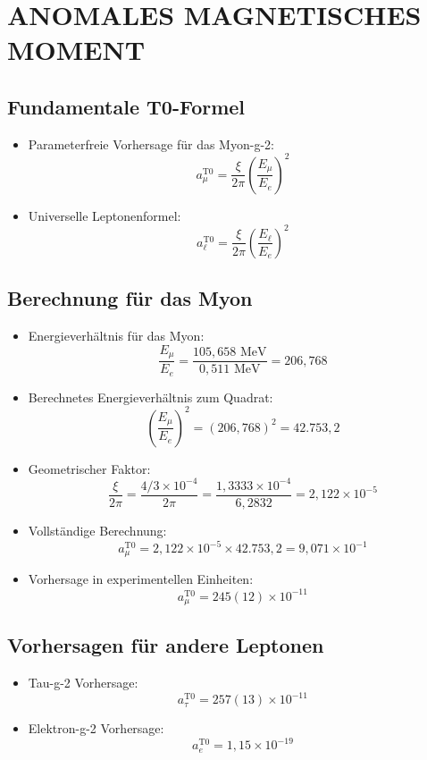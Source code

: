 \documentclass[12pt,a4paper]{article}
\begin{document}
	\section{ANOMALES MAGNETISCHES MOMENT}
	
	\subsection{Fundamentale T0-Formel}
	\begin{itemize}
		\item Parameterfreie Vorhersage f\"{u}r das Myon-g-2:
		$$\boxed{a_\mu^{\text{T0}} = \frac{\xi}{2\pi} \left(\frac{E_\mu}{E_e}\right)^2}$$
		
		\item Universelle Leptonenformel:
		$$\boxed{a_\ell^{\text{T0}} = \frac{\xi}{2\pi} \left(\frac{E_\ell}{E_e}\right)^2}$$
	\end{itemize}
	
	\subsection{Berechnung f\"{u}r das Myon}
	\begin{itemize}
		\item Energieverh\"{a}ltnis f\"{u}r das Myon:
		$$\frac{E_\mu}{E_e} = \frac{105,658 \text{ MeV}}{0,511 \text{ MeV}} = 206,768$$
		
		\item Berechnetes Energieverh\"{a}ltnis zum Quadrat:
		$$\left(\frac{E_\mu}{E_e}\right)^2 = (206,768)^2 = 42.753,2$$
		
		\item Geometrischer Faktor:
		$$\frac{\xi}{2\pi} = \frac{4/3 \times 10^{-4}}{2\pi} = \frac{1,3333 \times 10^{-4}}{6,2832} = 2,122 \times 10^{-5}$$
		
		\item Vollst\"{a}ndige Berechnung:
		$$a_\mu^{\text{T0}} = 2,122 \times 10^{-5} \times 42.753,2 = 9,071 \times 10^{-1}$$
		
		\item Vorhersage in experimentellen Einheiten:
		$$a_\mu^{\text{T0}} = 245(12) \times 10^{-11}$$
	\end{itemize}
	
	\subsection{Vorhersagen f\"{u}r andere Leptonen}
	\begin{itemize}
		\item Tau-g-2 Vorhersage:
		$$a_\tau^{\text{T0}} = 257(13) \times 10^{-11}$$
		
		\item Elektron-g-2 Vorhersage:
		$$a_e^{\text{T0}} = 1,15 \times 10^{-19}$$
	\end{itemize}
	
\end{document}
